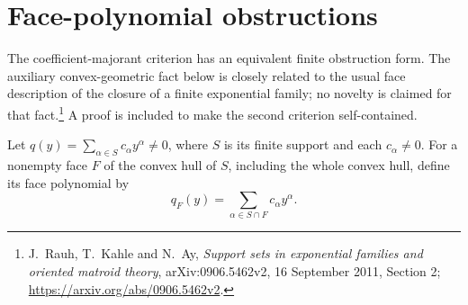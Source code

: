 \documentclass[11pt,a4paper]{article}
\theoremstyle{definition}
\theoremstyle{remark}
\begin{document}
\section{Face-polynomial obstructions}\label{sec:faces}

The coefficient-majorant criterion has an equivalent finite obstruction form.
The auxiliary convex-geometric fact below is closely related to the usual
face description of the closure of a finite exponential family; no novelty is
claimed for that fact.\footnote{\label{fn:faces}J.~Rauh, T.~Kahle and N.~Ay,
\emph{Support sets in exponential families and oriented matroid theory},
arXiv:0906.5462v2, 16 September 2011, Section 2;
\url{https://arxiv.org/abs/0906.5462v2}.}
A proof is included to make the second criterion self-contained.

Let $q(y)=\sum_{\alpha\in S}c_\alpha y^\alpha\ne0$, where $S$ is its finite
support and each $c_\alpha\ne0$. For a nonempty face $F$ of the convex hull of
$S$, including the whole convex hull, define its face polynomial by
\[
 q_F(y)=\sum_{\alpha\in S\cap F}c_\alpha y^\alpha.
\]
\end{document}
